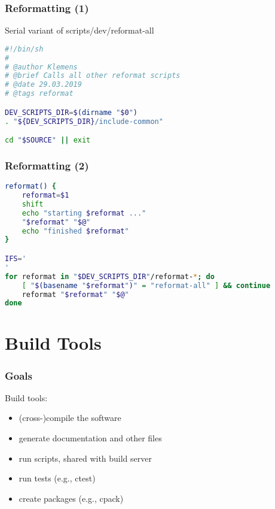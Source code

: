 \begin{frame}[fragile]
	\frametitle{Reformatting (1)}

	Serial variant of scripts/dev/reformat-all

	\begin{lstlisting}[language=sh]
#!/bin/sh
#
# @author Klemens
# @brief Calls all other reformat scripts
# @date 29.03.2019
# @tags reformat

DEV_SCRIPTS_DIR=$(dirname "$0")
. "${DEV_SCRIPTS_DIR}/include-common"

cd "$SOURCE" || exit

\end{lstlisting}
\end{frame}

\begin{frame}[fragile]
	\frametitle{Reformatting (2)}

	\begin{lstlisting}[language=sh,firstnumber=last]
reformat() {
	reformat=$1
	shift
	echo "starting $reformat ..."
	"$reformat" "$@"
	echo "finished $reformat"
}

IFS='
'
for reformat in "$DEV_SCRIPTS_DIR"/reformat-*; do
	[ "$(basename "$reformat")" = "reformat-all" ] && continue
	reformat "$reformat" "$@"
done\end{lstlisting}
\end{frame}

\section{Build Tools}

\begin{frame}[label=build script goals]
	\frametitle{Goals}

	Build tools:

	\begin{itemize}[<+-| alert@+>]
	\item (cross-)compile the software
	\item generate documentation and other files
	\item run scripts, shared with build server
	\item run tests (e.g., ctest)
	\item create packages (e.g., cpack)
	\end{itemize}
\end{frame}

